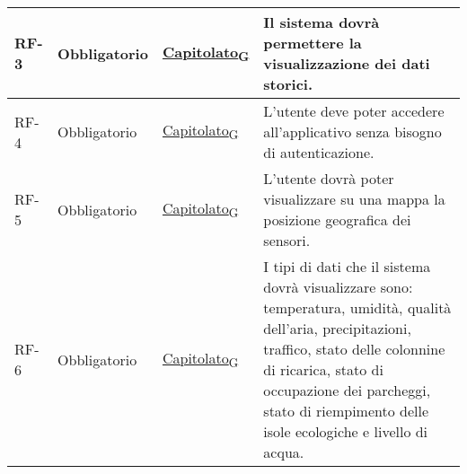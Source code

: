 \begin{longtable}{|>{\centering\arraybackslash}m{}|>{\centering\arraybackslash}m{}|>{\centering\arraybackslash}m{}|>{\centering\arraybackslash}m{}|}
	RF-3            & Obbligatorio        & \href{https://7last.github.io/docs/rtb/documentazione-interna/glossario\#capitolato}{Capitolato\textsubscript{G}} & Il sistema dovrà permettere la visualizzazione dei dati storici.                                                                                                                                                                                                                                                                                                                                                                                                                                     \\\hline
	RF-4            & Obbligatorio        & \href{https://7last.github.io/docs/rtb/documentazione-interna/glossario\#capitolato}{Capitolato\textsubscript{G}} & L'utente deve poter accedere all'applicativo senza bisogno di autenticazione.                                                                                                                                                                                                                                                                                                                                                                                                                        \\\hline
	RF-5            & Obbligatorio        & \href{https://7last.github.io/docs/rtb/documentazione-interna/glossario\#capitolato}{Capitolato\textsubscript{G}} & L'utente dovrà poter visualizzare su una mappa la posizione geografica dei sensori.                                                                                                                                                                                                                                                                                                                                                                                                                  \\\hline
	RF-6            & Obbligatorio        & \href{https://7last.github.io/docs/rtb/documentazione-interna/glossario\#capitolato}{Capitolato\textsubscript{G}} & I tipi di dati che il sistema dovrà visualizzare sono: temperatura, umidità, qualità dell'aria, precipitazioni, traffico, stato delle colonnine di ricarica, stato di occupazione dei parcheggi, stato di riempimento delle isole ecologiche e livello di acqua.                                                                                                                                                                                                                                     \\\hline

\end{longtable}
